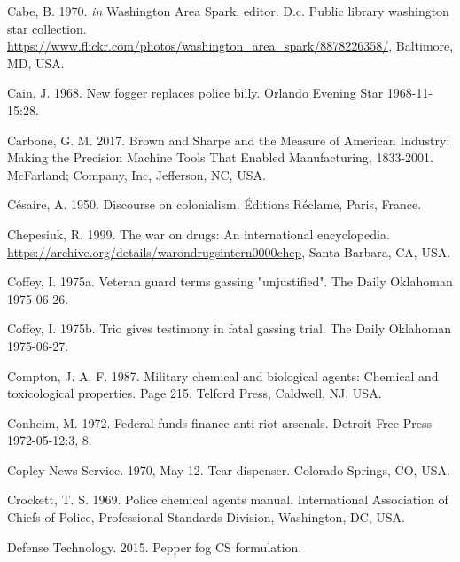 \documentclass[
  11pt,
]{krantz}
\newlength{\cslhangindent}
\newlength{\cslentryspacingunit} %
\newenvironment{CSLReferences}[2] %
 {%
  \setlength{\parindent}{0pt}
  \ifodd #1
  \let\oldpar\par
  \def\par{\hangindent=\cslhangindent\oldpar}
  \fi
  \setlength{\parskip}{#2\cslentryspacingunit}
 }%
 {}
\begin{document}
\begin{CSLReferences}{1}{0}
\leavevmode{}%
Cabe, B. 1970. \emph{in} Washington Area Spark, editor. D.c. Public library washington star collection. \url{https://www.flickr.com/photos/washington_area_spark/8878226358/}, Baltimore, MD, USA.

\leavevmode{}%
Cain, J. 1968. New fogger replaces police billy. Orlando Evening Star 1968-11-15:28.

\leavevmode{}%
Carbone, G. M. 2017. {Brown and Sharpe and the Measure of American Industry: Making the Precision Machine Tools That Enabled Manufacturing, 1833-2001}. McFarland; Company, Inc, Jefferson, NC, USA.

\leavevmode{}%
Césaire, A. 1950. Discourse on colonialism. Éditions Réclame, Paris, France.

\leavevmode{}%
Chepesiuk, R. 1999. The war on drugs: An international encyclopedia. \url{https://archive.org/details/warondrugsintern0000chep}, Santa Barbara, CA, USA.

\leavevmode{}%
Coffey, I. 1975a. Veteran guard terms gassing "unjustified". The Daily Oklahoman 1975-06-26.

\leavevmode{}%
Coffey, I. 1975b. Trio gives testimony in fatal gassing trial. The Daily Oklahoman 1975-06-27.

\leavevmode{}%
Compton, J. A. F. 1987. Military chemical and biological agents: Chemical and toxicological properties. Page 215. Telford Press, Caldwell, NJ, USA.

\leavevmode{}%
Conheim, M. 1972. Federal funds finance anti-riot arsenals. Detroit Free Press 1972-05-12:3, 8.

\leavevmode{}%
Copley News Service. 1970, May 12. Tear dispenser. Colorado Springs, CO, USA.

\leavevmode{}%
Crockett, T. S. 1969. Police chemical agents manual. International Association of Chiefs of Police, Professional Standards Division, Washington, DC, USA.

\leavevmode{}%
Defense Technology. 2015. Pepper fog CS formulation.


\end{CSLReferences}
\end{document}
